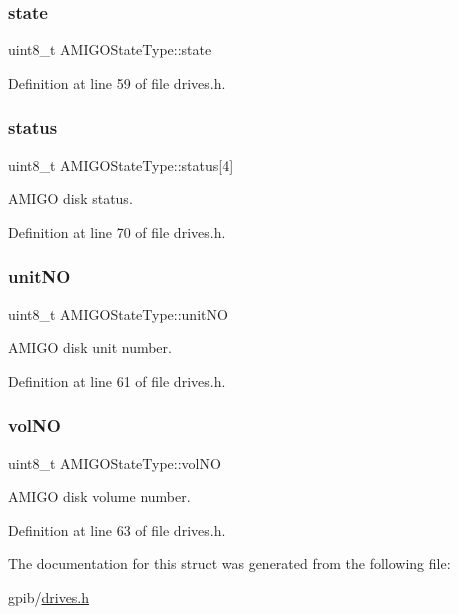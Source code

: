 \subsubsection{\texorpdfstring{state}{state}}
{\footnotesize\ttfamily uint8\+\_\+t A\+M\+I\+G\+O\+State\+Type\+::state}



Definition at line 59 of file drives.\+h.

\mbox{\label{structAMIGOStateType_a20ecb3cbbcb1fe4746c2d38edc125412}} 
\subsubsection{\texorpdfstring{status}{status}}
{\footnotesize\ttfamily uint8\+\_\+t A\+M\+I\+G\+O\+State\+Type\+::status\mbox{[}4\mbox{]}}



A\+M\+I\+GO disk status. 



Definition at line 70 of file drives.\+h.

\mbox{\label{structAMIGOStateType_a3d0cc02f8822c817feddf93dd08a5034}} 
\subsubsection{\texorpdfstring{unit\+NO}{unitNO}}
{\footnotesize\ttfamily uint8\+\_\+t A\+M\+I\+G\+O\+State\+Type\+::unit\+NO}



A\+M\+I\+GO disk unit number. 



Definition at line 61 of file drives.\+h.

\mbox{\label{structAMIGOStateType_a9825e282ac5844225a43b7f0835da67f}} 
\subsubsection{\texorpdfstring{vol\+NO}{volNO}}
{\footnotesize\ttfamily uint8\+\_\+t A\+M\+I\+G\+O\+State\+Type\+::vol\+NO}



A\+M\+I\+GO disk volume number. 



Definition at line 63 of file drives.\+h.



The documentation for this struct was generated from the following file\+:\begin{DoxyCompactItemize}
\item 
gpib/\hyperlink{drives_8h}{drives.\+h}\end{DoxyCompactItemize}
